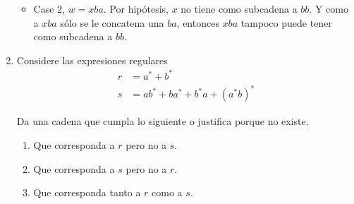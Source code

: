 \documentclass{article}
\begin{document}
\begin{enumerate}
{\begin{enumerate}
{\begin{itemize}
{\begin{itemize}
{                                    $bb$. Y como a $xa$ sólo se le concatena 
                                    una $a$, entonces $xa$ tampoco puede tener
                                    como subcadena a $bb$.
                                }
                                \item {
                                    Case 2, $w = xba$.
                                    Por hipótesis, $x$ no tiene como subcadena a
                                    $bb$. Y como a $xba$ sólo se le concatena 
                                    una $ba$, entonces $xba$ tampoco puede tener
                                    como subcadena a $bb$.
                                }
                            \end{itemize}
                        }
                    \end{itemize}
                }
            \end{enumerate}
            
        }
        \item {
            Considere las expresiones regulares
            \begin{align*}
                r &= a^* + b^* \\
                s &= ab^* + ba^* + b^*a + (a^*b)^*
            \end{align*}
            
            Da una cadena que cumpla lo siguiente o justifica porque no existe.
            \begin{enumerate}
                \item {
                    Que corresponda a $r$ pero no a $s$.
                }
                \item {
                    Que corresponda a $s$ pero no a $r$.
                }
                \item {
                    Que corresponda tanto a $r$ como a $s$.
                }
            \end{enumerate}
        }
    \end{enumerate}
\end{document}
